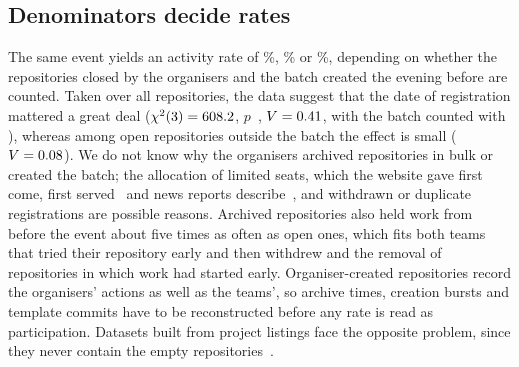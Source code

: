 \documentclass{article}
\begin{document}
\subsection{Denominators decide rates}
The same event yields an activity rate of \NRqOneActivePct\%, \NRqOneActiveOfOpenPct\% or \NRqOneActiveOfOpenNonbatchPct\%, depending on whether the repositories closed by the organisers and the batch created the evening before are counted. Taken over all repositories, the data suggest that the date of registration mattered a great deal ($\chi^2(\num{3}) = \num{608.2}$, $p$~\NRqOneCreationChiTwoAllP, $V = \num{0.41}$, with the batch counted with \batchday), whereas among open repositories outside the batch the effect is small ($V = \num{0.08}$). We do not know why the organisers archived repositories in bulk or created the batch; the allocation of limited seats, which the website gave first come, first served~\cite{hackalem2026site} and news reports describe~\cite{qumash2026queue,ulys2026survival}, and withdrawn or duplicate registrations are possible reasons. Archived repositories also held work from before the event about five times as often as open ones, which fits both teams that tried their repository early and then withdrew and the removal of repositories in which work had started early. Organiser-created repositories record the organisers' actions as well as the teams', so archive times, creation bursts and template commits have to be reconstructed before any rate is read as participation. Datasets built from project listings face the opposite problem, since they never contain the empty repositories~\cite{imam2021secretlife,mahmoud2022oneoff}.
\end{document}
